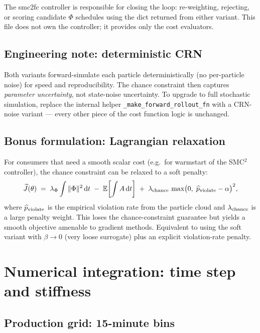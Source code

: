 \documentclass[11pt,a4paper]{article}
\theoremstyle{definition}
\newcommand{\dd}{\mathrm{d}}
\newcommand{\Ecal}{\mathbb{E}}
\begin{document}
The smc2fc controller is responsible for closing the loop:
re-weighting, rejecting, or scoring candidate $\Phi$ schedules using
the dict returned from either variant. This file does not own the
controller; it provides only the cost evaluators.

\subsection{Engineering note: deterministic CRN}

Both variants forward-simulate each particle deterministically (no
per-particle noise) for speed and reproducibility. The chance
constraint then captures \emph{parameter uncertainty}, not state-noise
uncertainty. To upgrade to full stochastic simulation, replace the
internal helper \texttt{\_make\_forward\_rollout\_fn} with a CRN-noise
variant — every other piece of the cost function logic is unchanged.

\subsection{Bonus formulation: Lagrangian relaxation}

For consumers that need a smooth scalar cost (e.g.\ for warmstart of
the SMC$^2$ controller), the chance constraint can be relaxed to a
soft penalty:
\begin{equation}
\widetilde J(\theta) \;=\; \lambda_\Phi \int \|\Phi\|^2 \, \dd t
   \;-\; \Ecal\!\left[\int A \, \dd t\right]
   \;+\; \lambda_{\rm chance} \, \max\!\big(0,\; \widehat p_{\rm violate} - \alpha\big)^2,
\end{equation}
where $\widehat p_{\rm violate}$ is the empirical violation rate from
the particle cloud and $\lambda_{\rm chance}$ is a large penalty
weight. This loses the chance-constraint guarantee but yields a smooth
objective amenable to gradient methods. Equivalent to using the soft
variant with $\beta \to 0$ (very loose surrogate) plus an explicit
violation-rate penalty.


\section{Numerical integration: time step and stiffness} \label{sec:integration}

\subsection{Production grid: 15-minute bins}
\end{document}
